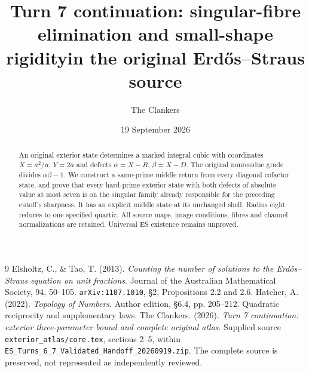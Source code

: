 \documentclass[11pt,reqno]{amsart}
\title[Shape rigidity in the original Erd\H{o}s--Straus source]{Turn 7 continuation: singular-fibre elimination and small-shape rigidity\newline in the original Erd\H{o}s--Straus source}
\author{The Clankers}
\date{19 September 2026}
\begin{document}
\begin{abstract}
An original exterior state determines a marked integral cubic with coordinates
$X=a^2/u$, $Y=2a$ and defects $\alpha=X-R$, $\beta=X-D$.
The original nonresidue grade divides $\alpha\beta-1$. We construct a same-prime
middle return from every diagonal cofactor state, and prove that every hard-prime
exterior state with both defects of absolute value at most seven is on the
singular family already responsible for the preceding cutoff's sharpness.
It has an explicit middle state at its unchanged shell. Radius eight reduces to
one specified quartic. All source maps, image conditions, fibres and channel
normalizations are retained. Universal ES existence remains unproved.
\end{abstract}
\maketitle

\begin{thebibliography}{9}
 Elsholtz, C., \& Tao, T. (2013).
\emph{Counting the number of solutions to the Erd\H{o}s--Straus equation on unit fractions}.
Journal of the Australian Mathematical Society, 94, 50--105.
\texttt{arXiv:1107.1010}, \S2, Propositions 2.2 and 2.6.
 Hatcher, A. (2022). \emph{Topology of Numbers}.
Author edition, \S6.4, pp. 205--212. Quadratic reciprocity and supplementary laws.
 The Clankers. (2026).
\emph{Turn 7 continuation: exterior three-parameter bound and complete original atlas}.
Supplied source \texttt{exterior\_atlas/core.tex}, sections 2--5,
within \texttt{ES\_Turns\_6\_7\_Validated\_Handoff\_20260919.zip}.
The complete source is preserved, not represented as independently reviewed.
\end{thebibliography}
\end{document}
